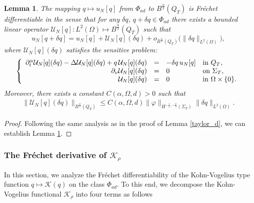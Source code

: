 \documentclass[a4paper,12pt,reqno,natbib]{amsart}
\newtheorem{lemma}[theorem]{Lemma}
\def\K{\mathcal K}
\begin{document}
\begin{lemma} \label{taylor_n}
The mapping $q\longmapsto u_N[q]$ from $\Phi_{ad}$ to $B^{\frac{\alpha}{2}}(Q_T)$ is Fr\'echet
differentiable in the sense that for any $\delta q$, $q+\delta q \in \Phi_{ad}$  there exists a bounded linear operator $\mathcal{U}_N[q]: L^2(\Omega) \mapsto B^{\frac{\alpha}{2}}(Q_T) $ such that
\begin{equation*}
    u_N [q+\delta q]=u_N [q]+\mathcal{U}_{N}[q] (\delta q)+o_{B^{\frac{\alpha}{2}}(Q_T)}\Big(\|\delta q\|_{L^2(\Omega)}\Big),
\end{equation*}
where $\mathcal{U}_{N}[q] (\delta q)$ satisfies the sensitive problem:
\begin{eqnarray} \label{P_n++}
\left\{
  \begin{array}{rcll}
    \partial_{t} ^{\alpha} \mathcal{U}_{N}[q] (\delta q)-\Delta \mathcal{U}_{N}[q] (\delta q) +q\, \mathcal{U}_{N}[q] (\delta q)&=& -\delta q\, u_N [q] &\hbox{in}\ Q_T, \\
    \partial_\nu \mathcal{U}_{N}[q] (\delta q) &=&0 &\hbox{on}\  \Sigma_T, \\
    \displaystyle \mathcal{U}_{N} [q](\delta q)&=&0  &\hbox{in}\ \Omega\times\{0\}.
  \end{array}
\right.
\end{eqnarray}
Moreover, there exists a constant $C(\alpha,\Omega,d)>0$ such that
\begin{align} \label{esq_N}
    \|\mathcal{U}_{N}[q] (\delta q)\|_{B^{\frac{\alpha}{2}}(Q_T)} \leq C(\alpha,\Omega,d)\|\varphi\|_{H^{-\frac{1}{2}, - \frac{\alpha}{4} }(\Sigma_T)}\|\delta q\|_{L^2(\Omega)}.
\end{align}
\end{lemma}

\begin{proof}
    Following the same analysis as in the proof of Lemma \ref{taylor_d}, we can establish Lemma \ref{taylor_n}.
\end{proof}


\subsubsection{\bf The Fr\'echet derivative of $\K_\rho$} 

In this section, we analyze the Fr\'echet differentiability of the Kohn-Vogelius type function $q \longmapsto \mathcal{K}(q)$ on the class $\Phi_{ad}$.  To this end, we decompose the Kohn-Vogelius functional $\mathcal{K}_\rho$ into four terms as follows
\end{document}
